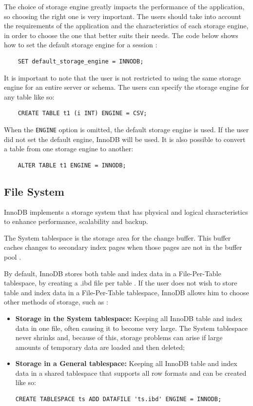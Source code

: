 \documentclass[12pt]{article}
\begin{document}
The choice of storage engine greatly impacts the performance of the application, so choosing the right one is very important. The users should take into account the requirements of the application and the characteristics of each storage engine, in order to choose the one that better suits their needs. The code below shows how to set the default storage engine for a session \parencite{SET_ENGINE}:
\begin{verbatim}
    SET default_storage_engine = INNODB;
\end{verbatim}

It is important to note that the user is not restricted to using the same storage engine for an entire server or schema. The users can specify the storage engine for any table like so:
\begin{verbatim}
    CREATE TABLE t1 (i INT) ENGINE = CSV;
\end{verbatim}

When the \verb|ENGINE| option is omitted, the default storage engine is used. If the user did not set the default engine, InnoDB will be used. It is also possible to convert a table from one storage engine to another:
\begin{verbatim}
    ALTER TABLE t1 ENGINE = INNODB;
\end{verbatim}



\subsection{File System}
\label{filesystem}
InnoDB implements a storage system that has physical and logical characteristics to enhance performance, scalability and backup.

The System tablespace is the storage area for the change buffer. This buffer caches changes to secondary index pages when those pages are not in the buffer pool \parencite{ChangeBuffer}. 

By default, InnoDB stores both table and index data in a File-Per-Table tablespace, by creating a .ibd file per table \parencite{FileperTable}. If the user does not wish to store table and index data in a File-Per-Table tablespace, InnoDB allows him to choose other methods of storage, such as \parencite{CreatingTablesInnoDB}:
\begin{itemize}
    \item  \textbf{Storage in the System tablespace:} Keeping all InnoDB table and index data in one file, often causing it to become very large. The System tablespace never shrinks and, because of this, storage problems can arise if large amounts of temporary data are loaded and then deleted;
    \item \textbf{Storage in a General tablespace:} Keeping all InnoDB table and index data in a shared tablespace that supports all row formats and can be created like so:
    
\begin{verbatim}
CREATE TABLESPACE ts ADD DATAFILE 'ts.ibd' ENGINE = INNODB;
\end{verbatim}
    
\end{itemize}
\end{document}
